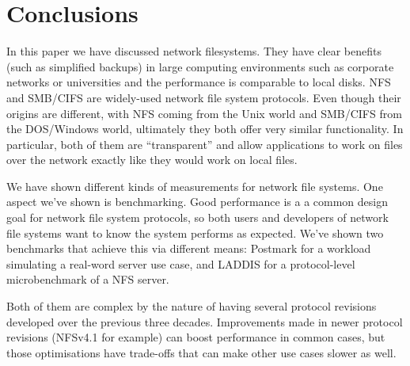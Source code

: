 \section{Conclusions}
In this paper we have discussed network filesystems.
They have clear benefits (such as simplified backups) in large computing environments such as corporate networks or universities
and the performance is comparable to local disks.
NFS and SMB/CIFS are widely-used network file system protocols.
Even though their origins are different, with NFS coming from the Unix world
and SMB/CIFS from the DOS/Windows world, ultimately they both offer very similar functionality.
In particular, both of them are ``transparent'' and allow applications to work on files over the network
exactly like they would work on local files.

We have shown different kinds of measurements for network file systems.
One aspect we've shown is benchmarking.
Good performance is a a common design goal for network file system protocols,
so both users and developers of network file systems want to know the system performs as expected.
We've shown two benchmarks that achieve this via different means:
Postmark for a workload simulating a real-word server use case,
and LADDIS for a protocol-level microbenchmark of a NFS server.

Both of them are complex by the nature of having several protocol revisions developed over the previous three decades.
Improvements made in newer protocol revisions (NFSv4.1 for example) can boost performance in common cases,
but those optimisations have trade-offs that can make other use cases slower as well.
